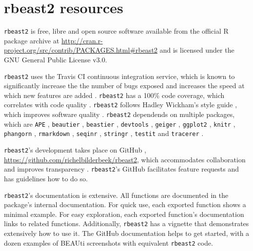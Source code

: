 \documentclass{article}
\begin{document}
\section{rbeast2 resources}

\verb;rbeast2; is free, libre and open source software available 
from the official R package archive at 
\url{http://cran.r-project.org/src/contrib/PACKAGES.html\#rbeast2}
and is licensed under the GNU General Public License v3.0.

\verb;rbeast2; uses the Travis CI \cite{travis} 
continuous integration service, which is known to significantly 
increase the the number of bugs exposed \cite{vasilescu2015} and increases
the speed at which new features are added \cite{vasilescu2015}.
\verb;rbeast2; has a 100\% code coverage, which correlates with code quality \cite{horgan1994,del1995correlation}. 
\verb;rbeast2; follows Hadley Wickham's style guide \cite{style_guide}, 
which improves software quality \cite{fang2001}.
\verb;rbeast2; dependends on multiple packages, which are 
\verb;APE; \cite{APE}, 
\verb;beautier; \cite{beautier},
\verb;beastier; \cite{beastier},
\verb;devtools; \cite{devtools},
\verb;geiger; \cite{GEIGER},
\verb;ggplot2; \cite{ggplot2},
\verb;knitr; \cite{knitr},
\verb;phangorn; \cite{phangorn},
\verb;rmarkdown; \cite{rmarkdown},
\verb;seqinr; \cite{seqinr},
\verb;stringr; \cite{stringr},
\verb;testit; \cite{testit} and 
\verb;tracerer; \cite{tracerer}.

\verb;rbeast2;'s development takes place on GitHub \cite{github},
\url{https://github.com/richelbilderbeek/rbeast2}, 
which accommodates collaboration \cite{perez2016ten} 
and improves transparency \cite{gorgolewski2016practical}.
\verb;rbeast2;'s GitHub facilitates feature requests and has guidelines how to do so.

\verb;rbeast2;'s documentation is extensive. All functions are documented
in the package's internal documentation. For quick use, 
each exported function shows a minimal example. 
For easy exploration, each exported function's documentation links to related functions.
Additionally, \verb;rbeast2; has a vignette that demonstrates extensively how
to use it. The GitHub documentation helps to get started, with a dozen examples 
of BEAUti screenshots with equivalent \verb;rbeast2; code.

\end{document}
